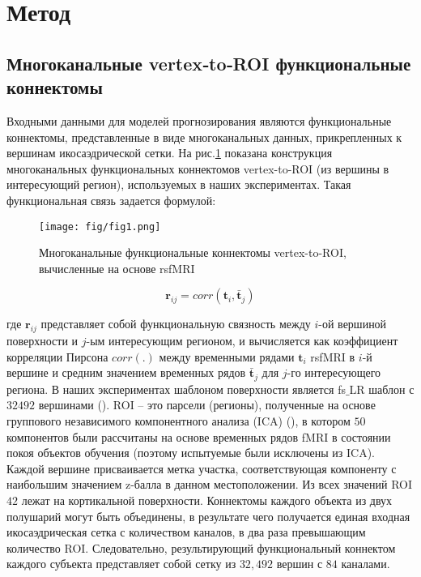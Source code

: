 \section{Метод}

\subsection{Многоканальные vertex‐to‐ROI функциональные коннектомы}

Входными данными для моделей прогнозирования являются функциональные коннектомы, представленные в виде многоканальных данных, прикрепленных к вершинам икосаэдрической сетки.
На рис.\ref{BrSurf2} показана конструкция многоканальных функциональных коннектомов vertex-to-ROI (из вершины в интересующий регион), используемых в наших экспериментах.
Такая функциональная связь задается формулой:

\begin{figure}
\centering
\texttt{[image: fig/fig1.png]}
\caption{\footnotesize{Многоканальные функциональные коннектомы vertex-to-ROI, вычисленные на основе rsfMRI}}
\label{BrSurf2}
\end{figure}

\begin{equation}
    \boldsymbol{r}_{ij} = corr(\boldsymbol{t}_i, \bar{\boldsymbol{t}}_j)
\end{equation}

где $\boldsymbol{r}_{ij}$ представляет собой функциональную связность между $i$-ой вершиной поверхности и $j$-ым интересующим регионом, и вычисляется как коэффициент корреляции Пирсона $corr(.)$  между временными рядами $\textbf{t}_i$ rsfMRI в $i$-й вершине и средним значением временных рядов $\bar{\textbf{t}}_j$ для $j$-го интересующего региона.
В наших экспериментах шаблоном поверхности является fs$\_$LR шаблон с $32 492$ вершинами (\cite{van2012parcellations}).
ROI -- это парсели (регионы), полученные на основе группового независимого компонентного анализа (ICA) (\cite{smith2013resting}), в котором $50$ компонентов были рассчитаны на основе временных рядов fMRI в состоянии покоя объектов обучения (поэтому испытуемые были исключены из ICA).
Каждой вершине присваивается метка участка, соответствующая компоненту с наибольшим значением z-балла в данном местоположении.
Из всех значений ROI $42$ лежат на кортикальной поверхности.
Коннектомы каждого объекта из двух полушарий могут быть объединены, в результате чего получается единая входная икосаэдрическая сетка с количеством каналов, в два раза превышающим количество ROI.
Следовательно, результирующий функциональный коннектом каждого субъекта представляет собой сетку из $32,492$ вершин с $84$ каналами.

